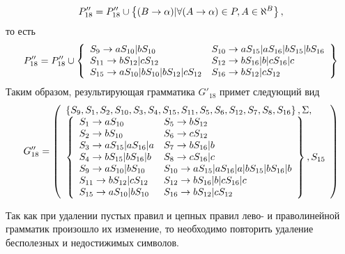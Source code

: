 \begin{itemize}
\begin{align*}
		      P''_{18} = P''_{18} \cup \left\{(B \to \alpha) | \forall (A \to \alpha) \in P, A \in \aleph^B\right\},
	      \end{align*}
	      то есть
	      \begin{align*}
		      P''_{18} = P''_{18} \cup \left\{
			      \begin{array}{ll}
				      S_9 \to aS_{10}|bS_{10}                    & S_{10} \to aS_{15}|aS_{16}|bS_{15}|bS_{16} \\
				      S_{11} \to bS_{12}|cS_{12}                 & S_{12} \to bS_{16}|b|cS_{16}|c             \\
				      S_{15} \to aS_{10}|bS_{10}|bS_{12}|cS_{12} & S_{16} \to bS_{12}|cS_{12}
			      \end{array}
		      \right\}
	      \end{align*}
	      Таким образом, результирующая грамматика \(G'_{18}\) примет следующий вид
	      \begin{align*}
		      G''_{18} = \left( \begin{array}{l} \left\{S_9, S_1, S_2, S_{10}, S_3, S_4, S_{15}, S_{11}, S_5, S_6, S_{12}, S_7, S_8, S_{16}\right\}, \Sigma,\\\left\{\begin{array}{ll} 
		      S_1 \to aS_{10}            & S_5 \to bS_{12}                                \\
		      S_2 \to bS_{10}            & S_6 \to cS_{12}                                \\
		      S_3 \to aS_{15}|aS_{16}|a  & S_7 \to bS_{16}|b                              \\
		      S_4 \to bS_{15}|bS_{16}|b  & S_8 \to cS_{16}|c                              \\
		      S_9 \to aS_{10}|bS_{10}    & S_{10} \to aS_{15}|aS_{16}|a|bS_{15}|bS_{16}|b \\
		      S_{11} \to bS_{12}|cS_{12} & S_{12} \to bS_{16}|b|cS_{16}|c                 \\
		      S_{15} \to aS_{10}|bS_{10} & S_{16} \to bS_{12}|cS_{12}
		       \end{array}\right\}, S_{15} \end{array} \right)
	      \end{align*}
\end{itemize}
Так как при удалении пустых правил и цепных правил лево- и праволинейной грамматик произошло их изменение, то необходимо повторить удаление бесполезных и недостижимых символов.
